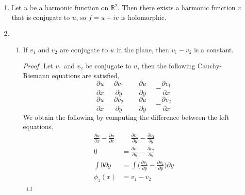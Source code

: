 \documentclass[12pt]{article}
\begin{document}
\begin{enumerate}
\begin{proof}
\begin{align*}
&+ \frac{\partial u}{\partial x}\frac{\cos \theta}{r} + \frac{\partial u}{\partial y} \frac{\sin \theta}{r} \\
&+ \sin^2\theta \frac{\partial^2 u}{\partial x^2} - \cos \theta \sin \theta \frac{\partial^2 u}{\partial x \partial y} - \frac{\cos\theta}{r} \frac{\partial u}{\partial x} \\ &-\sin\theta\cos\theta \frac{\partial^2 u}{\partial y \partial x} +  \cos \theta \sin \theta \frac{\partial^2 u}{\partial y^2} - \frac{\sin\theta}{r} \frac{\partial u}{\partial y} \\
&= \frac{\partial^2 u}{\partial x^2} (\cos^2\theta + \sin^2\theta) + \frac{\partial^2 u}{\partial y^2} (\cos^2\theta + \sin^2\theta) \\
&= \frac{\partial^2 u}{\partial x^2} + \frac{\partial^2 u}{\partial y^2} = \Delta u
\end{align*}
Therefore,
$$\Delta u  = \frac{\partial^2 u}{\partial r^2} + \frac{1}{r}\frac{\partial u}{\partial r} + \frac{1}{r^2} \frac{\partial^2 u}{\partial \theta^2} $$
\end{proof}
\item Let $u$ be a harmonic function on $\mathbb{R}^2$. Then there exists a harmonic function $v$ that is conjugate to $u$, so $f=u+iv$ is holomorphic. 
\item 
\begin{enumerate}
\item If $v_1$ and $v_2$ are conjugate to $u$ in the plane, then $v_1-v_2$ is a constant.
\begin{proof}
Let $v_1$ and $v_2$ be conjugate to $u$, then the following Cauchy-Riemann equations are satisfied,
$$ \frac{\partial u}{\partial x}  = \frac{\partial v_1}{\partial y} \hspace{25pt} \frac{\partial u}{\partial y}  = -\frac{\partial v_1}{\partial x}$$
$$ \frac{\partial u}{\partial x}  = \frac{\partial v_2}{\partial y} \hspace{25pt} \frac{\partial u}{\partial y}  = -\frac{\partial v_2}{\partial x}$$
We obtain the following by computing the difference between the left equations,
\begin{align*}
\frac{\partial u}{\partial x}-\frac{\partial u}{\partial x}  &= \frac{\partial v_1}{\partial y} -\frac{\partial v_2}{\partial y} \\
0 &= \frac{\partial v_1}{\partial y} -\frac{\partial v_2}{\partial y} \\
\int 0  \partial y &= \int \Big(\frac{\partial v_1}{\partial y} -\frac{\partial v_2}{\partial y}\Big) \partial y \\
\phi_1(x)&=v_1-v_2
\end{align*}


\end{proof}
\end{enumerate}
\end{enumerate}
\end{document}
